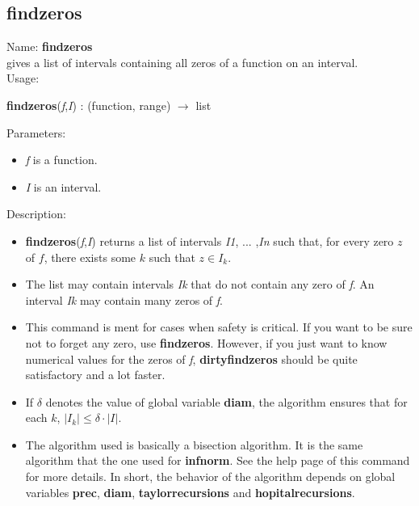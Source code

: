 \subsection{ findzeros }
\noindent Name: \textbf{findzeros}\\
gives a list of intervals containing all zeros of a function on an interval.\\

\noindent Usage: 
\begin{center}
\textbf{findzeros}(\emph{f},\emph{I}) : (\textsf{function}, \textsf{range}) $\rightarrow$ \textsf{list}\\
\end{center}
Parameters: 
\begin{itemize}
\item \emph{f} is a function.
\item \emph{I} is an interval.
\end{itemize}
\noindent Description: \begin{itemize}

\item \textbf{findzeros}(\emph{f},\emph{I}) returns a list of intervals \emph{I1}, ... ,\emph{In} such that, for 
   every zero $z$ of $f$, there exists some $k$ such that $z \in I_k$.

\item The list may contain intervals \emph{Ik} that do not contain any zero of \emph{f}.
   An interval \emph{Ik} may contain many zeros of \emph{f}.

\item This command is ment for cases when safety is critical. If you want to be sure
   not to forget any zero, use \textbf{findzeros}. However, if you just want to know 
   numerical values for the zeros of \emph{f}, \textbf{dirtyfindzeros} should be quite 
   satisfactory and a lot faster.

\item If $\delta$ denotes the value of global variable \textbf{diam}, the algorithm ensures
   that for each $k$, $|I_k| \le \delta \cdot |I|$.

\item The algorithm used is basically a bisection algorithm. It is the same algorithm
   that the one used for \textbf{infnorm}. See the help page of this command for more 
   details. In short, the behavior of the algorithm depends on global variables
   \textbf{prec}, \textbf{diam}, \textbf{taylorrecursions} and \textbf{hopitalrecursions}.
\end{itemize}

